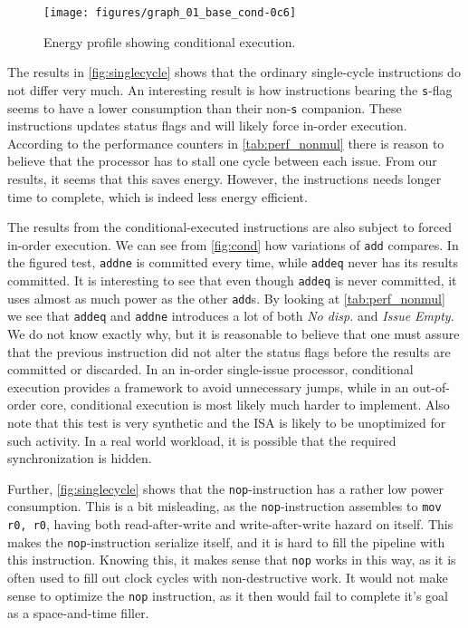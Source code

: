 \begin{figure}
    \centering
    \texttt{[image: figures/graph\_01\_base\_cond-0c6]}
    \caption{Energy profile showing conditional execution.}
    \label{fig:cond}
\end{figure}

The results in \autoref{fig:singlecycle} shows that the ordinary single-cycle
instructions do not differ very much. An interesting result is how instructions
bearing the \texttt{s}-flag seems to have a lower consumption than their
non-\texttt{s} companion. These instructions updates status flags and will
likely force in-order execution. According to the performance counters in
\autoref{tab:perf_nonmul} there is reason to believe that the processor has to
stall one cycle between each issue. From our results, it seems that this saves
energy. However, the instructions needs longer time to complete, which is indeed
less energy efficient.

The results from the conditional-executed instructions are also subject
to forced in-order execution. We can see from \autoref{fig:cond} how variations
of \texttt{add} compares. In the figured test, \texttt{addne} is
committed every time, while \texttt{addeq} never has its results committed. It
is interesting to see that even though \texttt{addeq} is never committed, it
uses almost as much power as the other \texttt{add}s. By looking at
\autoref{tab:perf_nonmul} we see that \texttt{addeq} and \texttt{addne}
introduces a lot of both \emph{No disp.} and \emph{Issue Empty}. We do not know
exactly why, but it is reasonable to believe that one must assure that the previous
instruction did not alter the status flags before the results are committed or
discarded. In an in-order single-issue processor, conditional execution provides
a framework to avoid unnecessary jumps, while in an out-of-order core,
conditional execution is most likely much harder to implement.  Also note that
this test is very synthetic and the ISA is likely to be unoptimized for such
activity. In a real world workload, it is possible that the required
synchronization is hidden.

Further, \autoref{fig:singlecycle} shows that the \texttt{nop}-instruction has a
rather low power consumption. This is a bit misleading, as the
\texttt{nop}-instruction assembles to \texttt{mov r0, r0}, having both
read-after-write and write-after-write hazard on itself. This makes the
\texttt{nop}-instruction serialize itself, and it is hard to fill the pipeline
with this instruction.  Knowing this, it makes sense that \texttt{nop} works in
this way, as it is often used to fill out clock cycles with non-destructive
work. It would not make sense to optimize the \texttt{nop} instruction, as it
then would fail to complete it's goal as a space-and-time filler.

